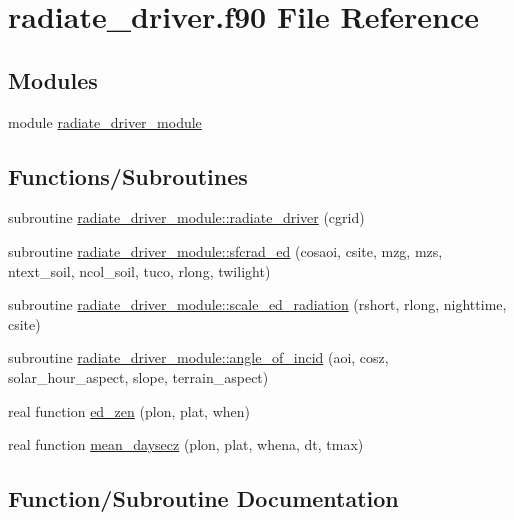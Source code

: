 \hypertarget{radiate__driver_8f90}{}\section{radiate\+\_\+driver.\+f90 File Reference}
\label{radiate__driver_8f90}
\subsection*{Modules}
\begin{DoxyCompactItemize}
\item 
module \hyperlink{namespaceradiate__driver__module}{radiate\+\_\+driver\+\_\+module}
\end{DoxyCompactItemize}
\subsection*{Functions/\+Subroutines}
\begin{DoxyCompactItemize}
\item 
subroutine \hyperlink{namespaceradiate__driver__module_a004efcf9e0a04145a85adfea8c23dd12}{radiate\+\_\+driver\+\_\+module\+::radiate\+\_\+driver} (cgrid)
\item 
subroutine \hyperlink{namespaceradiate__driver__module_af7561ae5fd5623b912a54a373ef9b801}{radiate\+\_\+driver\+\_\+module\+::sfcrad\+\_\+ed} (cosaoi, csite, mzg, mzs, ntext\+\_\+soil, ncol\+\_\+soil, tuco, rlong, twilight)
\item 
subroutine \hyperlink{namespaceradiate__driver__module_a3dfffe20cfda0b7cd6965a978d2d2aca}{radiate\+\_\+driver\+\_\+module\+::scale\+\_\+ed\+\_\+radiation} (rshort, rlong, nighttime, csite)
\item 
subroutine \hyperlink{namespaceradiate__driver__module_aa4adce0c0622d5665db3521504ef5c51}{radiate\+\_\+driver\+\_\+module\+::angle\+\_\+of\+\_\+incid} (aoi, cosz, solar\+\_\+hour\+\_\+aspect, slope, terrain\+\_\+aspect)
\item 
real function \hyperlink{radiate__driver_8f90_a2a40f6616130a988dc00df00fd848de5}{ed\+\_\+zen} (plon, plat, when)
\item 
real function \hyperlink{radiate__driver_8f90_a43ec6176af1ff5ea603858cec577ff95}{mean\+\_\+daysecz} (plon, plat, whena, dt, tmax)
\end{DoxyCompactItemize}


\subsection{Function/\+Subroutine Documentation}
\mbox{\label{radiate__driver_8f90_a2a40f6616130a988dc00df00fd848de5}} 
